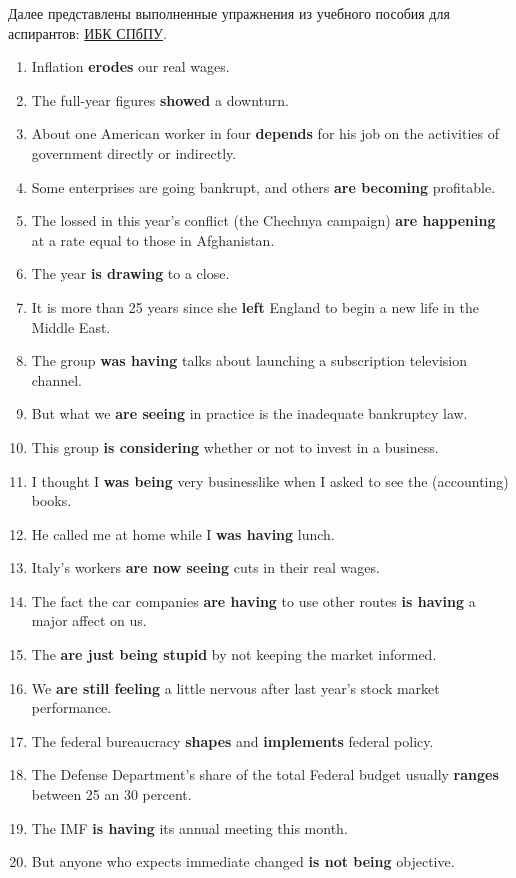 \documentclass[main.tex]{subfiles}
\begin{document}
\setcounter{secnumdepth}{0}

\setcounter{section}{103}

Далее представлены выполненные упражнения из учебного пособия для аспирантов: \href{https://elib.spbstu.ru/dl/2/s19-119.pdf/info}{ИБК СПбПУ}.

\setcounter{subsection}{1}


\begin{enumerate}[nosep,leftmargin=*]
	\itemsep\eitsp
	\item Inflation \textbf{erodes} our real wages.
	\item The full-year figures \textbf{showed} a downturn.
	\item About one American worker in four \textbf{depends} for his job on the activities of government directly or indirectly.
	\item Some enterprises are going bankrupt, and others \textbf{are becoming} profitable.
	\item The lossed in this year's conflict (the Chechnya campaign) \textbf{are happening} at a rate equal to those in Afghanistan.
	\item The year \textbf{is drawing} to a close.
	\item It is more than 25 years since she \textbf{left} England to begin a new life in the Middle East.
	\item The group \textbf{was having} talks about launching a subscription television channel.
	\item But what we \textbf{are seeing} in practice is the inadequate bankruptcy law.
	\item This group \textbf{is considering} whether or not to invest in a business.
	\item I thought I \textbf{was being} very businesslike when I asked to see the (accounting) books.
	\item He called me at home while I \textbf{was having} lunch.
	\item Italy's workers \textbf{are now seeing} cuts in their real wages.
	\item The fact the car companies \textbf{are having} to use other routes \textbf{is having} a major affect on us.
	\item The \textbf{are just being stupid} by not keeping the market informed.
	\item We \textbf{are still feeling} a little nervous after last year's stock market performance.
	\item The federal bureaucracy \textbf{shapes} and \textbf{implements} federal policy.
	\item The Defense Department's share of the total Federal budget usually \textbf{ranges} between 25 an 30 percent.
	\item The IMF \textbf{is having} its annual meeting this month.
	\item But anyone who expects immediate changed \textbf{is not being} objective.
\end{enumerate}
\ 
\end{document}
